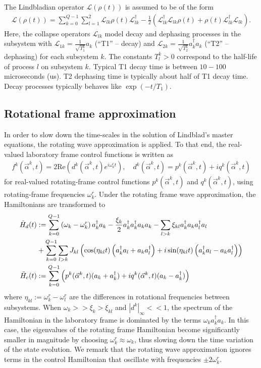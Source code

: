 \documentclass[11pt]{article}
\newcommand{\Ell}{\mathcal{L}}
\begin{document}
The Lindbladian operator $\Ell(\rho(t))$ is assumed to be of the form 
\begin{align}
  \Ell(\rho(t)) = \sum_{k=0}^{Q-1} \sum_{l=1}^2 \Ell_{lk} \rho(t)
  \Ell_{lk}^{\dagger} - \frac 1 2 \left( \Ell_{lk}^{\dagger}\Ell_{lk}
  \rho(t) + \rho(t)\Ell_{lk}^{\dagger} \Ell_{lk}\right).
\end{align}
Here, the collapse operators $\Ell_{lk}$ model decay and dephasing processes in the subsystem with $\Ell_{1k} = \frac{1}{\sqrt{T_1^k}} a_k$ (``T1'' -- decay) and $\Ell_{2k} = \frac{1}{\sqrt{T_2^k}} a_k^{\dagger}a_k$ (``T2'' -- dephasing) for each subsystem $k$. The constants $T_l^k>0$ correspond to the half-life of process $l$ on subsystem $k$. Typical T1 decay time is between $10-100$ microseconds (us). T2 dephasing time is typically about half of T1 decay time. Decay processes typically behaves like $\exp(-t/{T_1})$.



\subsection{Rotational frame approximation}
In order to slow down the time-scales in the solution of Lindblad's master equations, the rotating wave approximation is applied. To that end, the real-valued laboratory frame control functions is written as 
\begin{align}
  f^k(\vec{\alpha}^k,t) = 2\mbox{Re}\left(d^k(\vec{\alpha}^k,t)e^{i\omega_k^r t}\right), \quad d^k(\vec{\alpha}^k,t) = p^k(\vec{\alpha}^k,t) + i q^k(\vec{\alpha}^k,t)
\end{align}
for real-valued rotating-frame control functions $p^k(\vec{\alpha}^k,t)$ and $q^k(\vec{\alpha}^k,t)$, using rotating-frame frequencies $\omega_k^r$. Under the rotating frame wave approximation, the Hamiltonians are transformed to 
\begin{align} 
  \tilde H_d(t) &:= \sum_{k=0}^{Q-1} \left(\omega_k - \omega_k^{r}\right)a_k^{\dagger}a_k- \frac{\xi_k}{2}
  a_k^{\dagger}a_k^{\dagger}a_k a_k  
   - \sum_{l> k} \xi_{kl} a_{k}^{\dagger}a_{k}   a_{l}^{\dagger} a_{l} \notag \\
   & + \sum_{k=0}^{Q-1}\sum_{l>k} J_{kl} \left(\cos(\eta_{kl}t) \left(a_k^\dagger a_l + a_k a_l^\dagger\right) + i\sin(\eta_{kl}t)\left(a_k^\dagger a_l - a_k a_l^\dagger\right) \right) \label{eq:Hd_rotating} \\
   \tilde H_c(t) &:= \sum_{k=0}^{Q-1} \left( p^k(\vec{\alpha}^k,t) (a_k +
   a_k^{\dagger}) + i q^k(\vec{\alpha}^k,t)(a_k - a_k^{\dagger})
   \right)  \label{eq:Hc_rotating}
\end{align} 
where $\eta_{kl} := \omega_k^{r} - \omega_l^{r}$ are the differences in rotational frequencies between subsystems. When $\omega_k >> \xi_k > \xi_{kl}$ and $|d^k|_{\infty} << 1$, the spectrum of the Hamiltonian in the laboratory frame is dominated by the terms $\omega_ka_k^\dagger a_k$. In this case, the eigenvalues of the rotating frame Hamiltonian become significantly smaller in magnitude by choosing $\omega_k^r \approx \omega_k$, thus slowing down the time variation of the state evolution. We remark that the rotating wave approximation ignores terms in the control Hamiltonian that oscillate with frequencies $\pm 2\omega_k^r$. 
\end{document}
